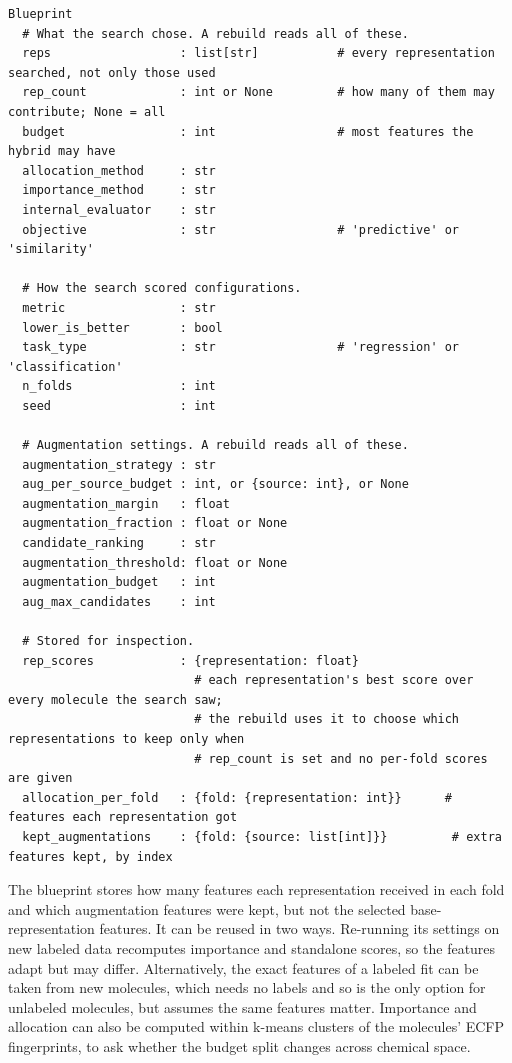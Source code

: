 \begin{lstlisting}[float=htbp, breaklines=true, basicstyle=\scriptsize\ttfamily, columns=fullflexible, keepspaces=true, frame=single, caption={Fields of a blueprint and their types. Comment lines group the fields, and each field is given with its type and, where needed, a comment on its meaning.}, label=lst:blueprint, captionpos=b]
Blueprint
  # What the search chose. A rebuild reads all of these.
  reps                  : list[str]           # every representation searched, not only those used
  rep_count             : int or None         # how many of them may contribute; None = all
  budget                : int                 # most features the hybrid may have
  allocation_method     : str
  importance_method     : str
  internal_evaluator    : str
  objective             : str                 # 'predictive' or 'similarity'

  # How the search scored configurations.
  metric                : str
  lower_is_better       : bool
  task_type             : str                 # 'regression' or 'classification'
  n_folds               : int
  seed                  : int

  # Augmentation settings. A rebuild reads all of these.
  augmentation_strategy : str
  aug_per_source_budget : int, or {source: int}, or None
  augmentation_margin   : float
  augmentation_fraction : float or None
  candidate_ranking     : str
  augmentation_threshold: float or None
  augmentation_budget   : int
  aug_max_candidates    : int

  # Stored for inspection.
  rep_scores            : {representation: float}
                          # each representation's best score over every molecule the search saw;
                          # the rebuild uses it to choose which representations to keep only when
                          # rep_count is set and no per-fold scores are given
  allocation_per_fold   : {fold: {representation: int}}      # features each representation got
  kept_augmentations    : {fold: {source: list[int]}}         # extra features kept, by index
\end{lstlisting}



The blueprint stores how many features each representation received in each fold and which augmentation features were kept, but not the selected base-representation features. It can be reused in two ways. Re-running its settings on new labeled data recomputes importance and standalone scores, so the features adapt but may differ. Alternatively, the exact features of a labeled fit can be taken from new molecules, which needs no labels and so is the only option for unlabeled molecules, but assumes the same features matter. Importance and allocation can also be computed within k-means clusters of the molecules' ECFP fingerprints, to ask whether the budget split changes across chemical space.

